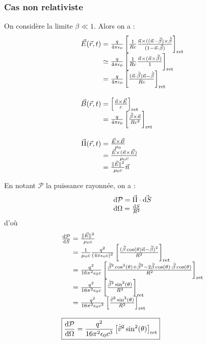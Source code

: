 \subsubsection{Cas non relativiste}
On considère la limite $\beta\ll 1$. Alors on a :
$$
	\begin{array}{r@{\;}l}
		\vec{E}(\vec{r},t)&=\frac{q}{4\pi\epsilon_0}\left[\frac{1}{Rc}\frac{\vec{n}\times((\vec{n}-\vec{\beta})\times\dot{\vec{\beta}}}{(1-\vec{n}\cdot\vec{\beta})}\right]_{\text{ret}}\\
			&\simeq\frac{q}{4\pi\epsilon_0}\left[\frac{1}{Rc}\frac{\vec{n}\times(\vec{n}\times\dot{\vec{\beta}})}{1}\right]_{\text{ret}}\\
			&=\frac{q}{4\pi\epsilon_0}\left[\frac{(\vec{n}\cdot\dot{\vec{\beta}})\vec{n}-\dot{\vec{\beta}}}{Rc}\right]_{\text{ret}}\\[20pt]
		\vec{B}(\vec{r},t)&=\left[\frac{\vec{n}\times\vec{E}}{c}\right]_{\text{ret}}\\
			&=\frac{q}{4\pi\epsilon_0}\left[\frac{\dot{\vec{\beta}}\times\vec{n}}{Rc^2}\right]_{\text{ret}}\\[20pt]
		\vec{\Pi}(\vec{r},t)&=\frac{\vec{E}\times\vec{B}}{\mu_0}\\
			&=\frac{\vec{E}\times(\vec{n}\times\vec{E})}{\mu_0c}\\
			&=\frac{\|\vec{E}\|^2}{\mu_0c}\vec{n}
	\end{array}
$$

En notant $\mathcal{P}$ la puissance rayonnée, on a :
$$
	\begin{array}{l}
		\mathrm{d} \mathcal{P}=\vec{\Pi}\cdot\vec{\mathrm{d} S}\\
		\mathrm{d} \Omega=\frac{\mathrm{d} S}{R^2}
	\end{array}
$$
d'où
$$
	\begin{array}{r@{\;}l}
		 \frac{\dif \mathcal{P}}{\dif S}&=\frac{\|\vec{E}\|^2}{\mu_0c}\\
		 	&=\frac{1}{\mu_0c}\frac{q^2}{(4\pi\epsilon_0c)^2}
		 		\left[\frac{(\dot{\vec{\beta}}\cos(\theta)\vec{n}-\dot{\vec{\beta}})^2}{R^2}\right]_{\text{ret}}\\
		 	&=\frac{q^2}{16\pi^2\epsilon_0c}\left[
		 		\frac{\dot{\vec{\beta}}^2\cos^2(\theta)+\dot{\vec{\beta}}^2
		 		-2\dot{\vec{\beta}}\cos(\theta)\cdot\dot{\vec{\beta}}\cos(\theta)}
		 		{R^2}\right]_{\text{ret}}\\
		 	&=\frac{q^2}{16\pi^2\epsilon_0c}\left[
		 		\frac{\dot{\vec{\beta}}^2\sin^2(\theta)}{R^2}\right]_{\text{ret}}\\
		 	&=\frac{q^2}{16\pi^2\epsilon_0c^3}\left[
		 		\frac{\dot{\vec{v}}^2\sin^2(\theta)}{R^2}\right]_{\text{ret}}\\[15pt]
		 	\multicolumn{2}{l}{\boxed{\frac{\dif \mathcal{P}}{\dif \Omega}=\frac{q^2}{16\pi^2\epsilon_0c^3}\left[
		 		\dot{\vec{v}}^2\sin^2(\theta)\right]_{\text{ret}}}}
	\end{array}
$$

